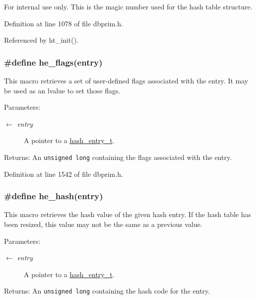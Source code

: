 \begin{Desc}
\item[For internal use only.]
This is the magic number used for the hash table structure.\end{Desc}


Definition at line 1078 of file dbprim.h.

Referenced by ht\_\-init().\hypertarget{group__dbprim__hash_ga40}{
\subsubsection[he\_\-flags]{\setlength{\rightskip}{0pt plus 5cm}\#define he\_\-flags(entry)}}
\label{group__dbprim__hash_ga40}


This macro retrieves a set of user-defined flags associated with the entry. It may be used as an lvalue to set those flags.

\begin{Desc}
\item[Parameters:]
\begin{description}
\item[\mbox{$\leftarrow$} {\em entry}]A pointer to a \hyperlink{group__dbprim__hash_ga2}{hash\_\-entry\_\-t}.\end{description}
\end{Desc}
\begin{Desc}
\item[Returns:]An {\tt unsigned long} containing the flags associated with the entry.\end{Desc}


Definition at line 1542 of file dbprim.h.\hypertarget{group__dbprim__hash_ga42}{
\subsubsection[he\_\-hash]{\setlength{\rightskip}{0pt plus 5cm}\#define he\_\-hash(entry)}}
\label{group__dbprim__hash_ga42}


This macro retrieves the hash value of the given hash entry. If the hash table has been resized, this value may not be the same as a previous value.

\begin{Desc}
\item[Parameters:]
\begin{description}
\item[\mbox{$\leftarrow$} {\em entry}]A pointer to a \hyperlink{group__dbprim__hash_ga2}{hash\_\-entry\_\-t}.\end{description}
\end{Desc}
\begin{Desc}
\item[Returns:]An {\tt unsigned long} containing the hash code for the entry.\end{Desc}


